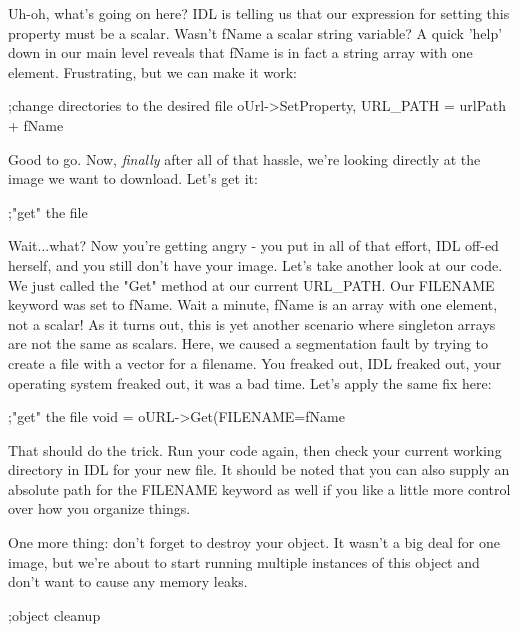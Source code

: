 \documentclass{book}
\newcounter{highlight}[page]
\newcommand{\tikzhighlightanchor}[1]{\ensuremath{\vcenter{\hbox{\tikz[remember picture, overlay]{\coordinate (#1 highlight \arabic{highlight});}}}}}
\newcommand{\bh}[0]{\stepcounter{highlight}\tikzhighlightanchor{begin}}
\newcommand{\eh}[0]{\tikzhighlightanchor{end}}
\theoremstyle{aside_style}
\begin{document}
Uh-oh, what's going on here? IDL is telling us that our expression for setting this property must be a scalar.
Wasn't fName a scalar string variable?
A quick 'help' down in our main level reveals that fName is in fact a string array with one element.
Frustrating, but we can make it work:

\begin{idl}
;change directories to the desired file
oUrl->SetProperty, URL_PATH = urlPath + fName%
\end{idl}

Good to go. Now, \textit{finally} after all of that hassle, we're looking directly at the image we want to download. Let's get it:

\begin{idl}
;"get" the file
\end{idl}

Wait...what? Now you're getting angry - you put in all of that effort, IDL off-ed herself, and you still don't have your image.
Let's take another look at our code. We just called the "Get" method at our current URL\_PATH. 
Our FILENAME keyword was set to fName. Wait a minute, fName is an array with one element, not a scalar!
As it turns out, this is yet another scenario where singleton arrays are not the same as scalars.
Here, we caused a segmentation fault by trying to create a file with a vector for a filename.
You freaked out, IDL freaked out, your operating system freaked out, it was a bad time. Let's apply the same fix here:

\begin{idl}
;"get" the file
void = oURL->Get(FILENAME=fName%
\end{idl}

That should do the trick. Run your code again, then check your current working directory in IDL for your new file.
It should be noted that you can also supply an absolute path for the FILENAME keyword as well if you like a little more control over how you organize things.

One more thing: don't forget to destroy your object.
It wasn't a big deal for one image, but we're about to start running multiple instances of this object and don't want to cause any memory leaks.

\begin{idl}
;object cleanup
\end{idl}


\end{document}
